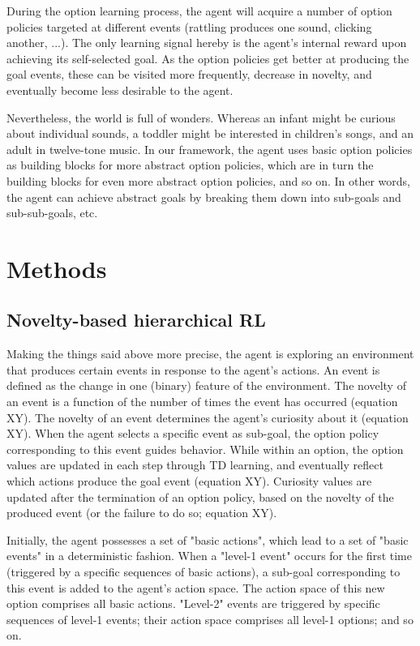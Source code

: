 \documentclass{article}
\begin{document}
During the option learning process, the agent will acquire a number of option policies targeted at different events (rattling produces one sound, clicking another, ...). The only learning signal hereby is the agent's internal reward upon achieving its self-selected goal. As the option policies get better at producing the goal events, these can be visited more frequently, decrease in novelty, and eventually become less desirable to the agent. 

Nevertheless, the world is full of wonders. Whereas an infant might be curious about individual sounds, a toddler might be interested in children's songs, and an adult in twelve-tone music. In our framework, the agent uses basic option policies as building blocks for more abstract option policies, which are in turn the building blocks for even more abstract option policies, and so on. In other words, the agent can achieve abstract goals by breaking them down into sub-goals and sub-sub-goals, etc.


\section{Methods}

\subsection{Novelty-based hierarchical RL}

Making the things said above more precise, the agent is exploring an environment that produces certain events in response to the agent's actions. An event is defined as the change in one (binary) feature of the environment. The novelty of an event is a function of the number of times the event has occurred (equation XY). The novelty of an event determines the agent's curiosity about it (equation XY). When the agent selects a specific event as sub-goal, the option policy corresponding to this event guides behavior. While within an option, the option values are updated in each step through TD learning, and eventually reflect which actions produce the goal event (equation XY). Curiosity values are updated after the termination of an option policy, based on the novelty of the produced event (or the failure to do so; equation XY).

Initially, the agent possesses a set of "basic actions", which lead to a set of "basic events" in a deterministic fashion. When a "level-1 event" occurs for the first time (triggered by a specific sequences of basic actions), a sub-goal corresponding to this event is added to the agent's action space. The action space of this new option comprises all basic actions. "Level-2" events are triggered by specific sequences of level-1 events; their action space comprises all level-1 options; and so on.
\end{document}
